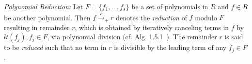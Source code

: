 
{\it Polynomial Reduction:} Let $F=\{f_1,\dots,f_s\}$ be
a set of polynomials in $R$ and $f\in R$ be 
another polynomial. Then $f\xrightarrow{F}_+r$ denotes the {\it
  reduction} of $f$ modulo $F$ resulting in remainder $r$, which is
obtained by iteratively canceling terms in $f$ by $lt(f_j), f_j\in F$,
via polynomial division (cf. Alg. 1.5.1~\cite{gb_book}). The
remainder $r$ is said to be {\it reduced} such that no term in $r$ is
divisible by the leading term of any $f_j \in F$.



